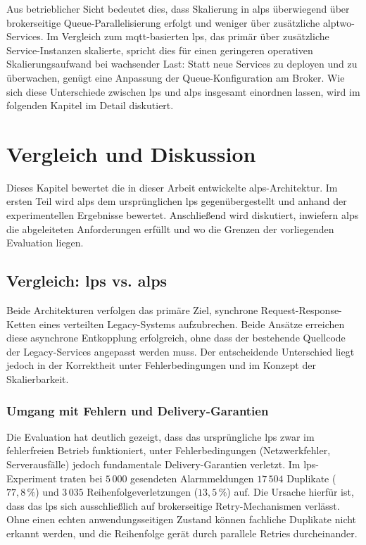 Aus betrieblicher Sicht bedeutet dies, dass Skalierung in \gls{alps} überwiegend über brokerseitige Queue-Parallelisierung erfolgt und weniger über zusätzliche \gls{alptwo}-Services. Im Vergleich zum \gls{mqtt}-basierten \gls{lps}, das primär über zusätzliche Service-Instanzen skalierte, spricht dies für einen geringeren operativen Skalierungsaufwand bei wachsender Last: Statt neue Services zu deployen und zu überwachen, genügt eine Anpassung der Queue-Konfiguration am Broker. Wie sich diese Unterschiede zwischen \gls{lps} und \gls{alps} insgesamt einordnen lassen, wird im folgenden Kapitel im Detail diskutiert.

\chapter{Vergleich und Diskussion}
\label{ch:vergleich}

Dieses Kapitel bewertet die in dieser Arbeit entwickelte \gls{alps}-Architektur. Im ersten Teil wird \gls{alps} dem ursprünglichen \gls{lps} gegenübergestellt und anhand der experimentellen Ergebnisse bewertet. Anschließend wird diskutiert, inwiefern \gls{alps} die abgeleiteten Anforderungen erfüllt und wo die Grenzen der vorliegenden Evaluation liegen.

\section{Vergleich: \acrshort{lps} vs. \acrshort{alps}}

Beide Architekturen verfolgen das primäre Ziel, synchrone Request-Response-Ketten eines verteilten Legacy-Systems aufzubrechen. Beide Ansätze erreichen diese asynchrone Entkopplung erfolgreich, ohne dass der bestehende Quellcode der Legacy-Services angepasst werden muss. Der entscheidende Unterschied liegt jedoch in der Korrektheit unter Fehlerbedingungen und im Konzept der Skalierbarkeit.

\subsection{Umgang mit Fehlern und Delivery-Garantien}
Die Evaluation hat deutlich gezeigt, dass das ursprüngliche \gls{lps} zwar im fehlerfreien Betrieb funktioniert, unter Fehlerbedingungen (Netzwerkfehler, Serverausfälle) jedoch fundamentale Delivery-Garantien verletzt. Im \gls{lps}-Experiment traten bei $5\,000$ gesendeten Alarmmeldungen $17\,504$ Duplikate ($77{,}8\,\%$) und $3\,035$ Reihenfolgeverletzungen ($13{,}5\,\%$) auf. Die Ursache hierfür ist, dass das \gls{lps} sich ausschließlich auf brokerseitige Retry-Mechanismen verlässt. Ohne einen echten anwendungsseitigen Zustand können fachliche Duplikate nicht erkannt werden, und die Reihenfolge gerät durch parallele Retries durcheinander.

